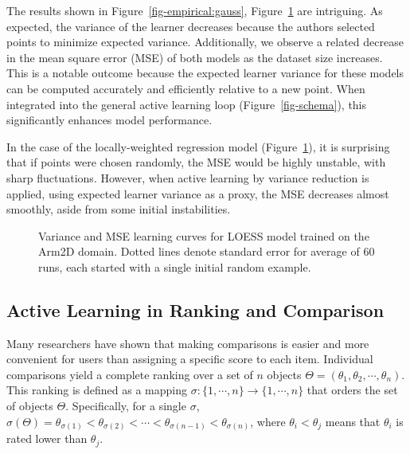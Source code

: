 \documentclass[
  letterpaper,
  numbers=noenddot,
  DIV=11]{scrreprt}
\theoremstyle{plain}
\theoremstyle{definition}
\theoremstyle{plain}
\theoremstyle{remark}
\begin{document}
The results shown in
Figure~\ref{fig-empirical:gauss}, Figure~\ref{fig-empirical:regress} are
intriguing. As expected, the variance of the learner decreases because
the authors selected points to minimize expected variance. Additionally,
we observe a related decrease in the mean square error (MSE) of both
models as the dataset size increases. This is a notable outcome because
the expected learner variance for these models can be computed
accurately and efficiently relative to a new point. When integrated into
the general active learning loop (Figure~\ref{fig-schema}), this
significantly enhances model performance.

In the case of the locally-weighted regression model
(Figure~\ref{fig-empirical:regress}), it is surprising that if points
were chosen randomly, the MSE would be highly unstable, with sharp
fluctuations. However, when active learning by variance reduction is
applied, using expected learner variance as a proxy, the MSE decreases
almost smoothly, aside from some initial instabilities.

\begin{figure}


\caption{\label{fig-empirical:regress}Variance and MSE learning curves
for LOESS model trained on the Arm2D domain. Dotted lines denote
standard error for average of 60 runs, each started with a single
initial random example.}

\end{figure}%

\subsection{Active Learning in Ranking and
Comparison}\label{active-learning-in-ranking-and-comparison}

Many researchers have shown that making comparisons is easier and more
convenient for users than assigning a specific score to each item.
Individual comparisons yield a complete ranking over a set of \(n\)
objects \(\Theta = (\theta_1, \theta_2, \cdots, \theta_n)\). This
ranking is defined as a mapping
\(\sigma : \{1, \cdots, n\} \rightarrow \{1,\cdots, n\}\) that orders
the set of objects \(\Theta\). Specifically, for a single \(\sigma\),
\(\sigma(\Theta) = \theta_{\sigma(1)} < \theta_{\sigma(2)} < \cdots < \theta_{\sigma(n-1)} < \theta_{\sigma(n)}\),
where \(\theta_{i} < \theta_{j}\) means that \(\theta_{i}\) is rated
lower than \(\theta_{j}\).
\end{document}
